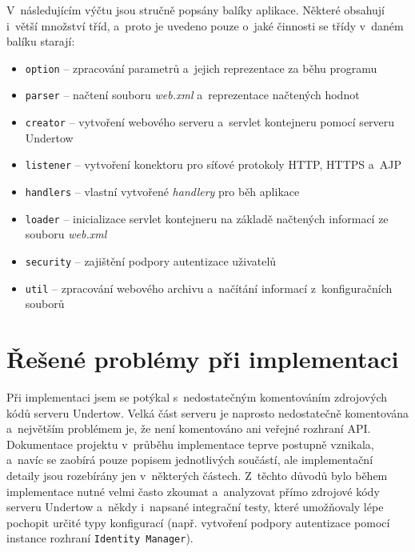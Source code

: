             V~následujícím výčtu jsou stručně popsány balíky aplikace.
            Některé obsahují i~větší množství tříd, a~proto je uvedeno pouze o~jaké činnosti
            se třídy v~daném balíku starají:
            \begin{itemize}
                \item \texttt{option} -- zpracování parametrů a~jejich reprezentace za běhu programu
                \item \texttt{parser} -- načtení souboru \emph{web.xml} a~reprezentace načtených hodnot
                \item \texttt{creator} -- vytvoření webového serveru a~servlet kontejneru pomocí serveru Undertow
                \item \texttt{listener} -- vytvoření konektoru pro síťové protokoly HTTP, HTTPS a~AJP
                \item \texttt{handlers} -- vlastní vytvořené \emph{handlery} pro běh aplikace
                \item \texttt{loader} -- inicializace servlet kontejneru na základě načtených informací ze souboru \emph{web.xml}
                \item \texttt{security} -- zajištění podpory autentizace uživatelů
                \item \texttt{util} -- zpracování webového archivu a~načítání informací z~konfiguračních souborů
            \end{itemize}

            



    \section{Řešené problémy při implementaci} \label{implProblemy}
        Při implementaci jsem se potýkal s~nedostatečným komentováním zdrojových kódů serveru Undertow.
        Velká část serveru je naprosto nedostatečně komentována a~největším problémem je, že
        není komentováno ani veřejné rozhraní API. 
        Dokumentace projektu v~průběhu implementace teprve postupně vznikala, a~navíc se zaobírá pouze popisem jednotlivých součástí,
        ale implementační detaily jsou rozebírány jen v~některých částech.
        Z~těchto důvodů bylo během implementace nutné velmi často zkoumat a~analyzovat přímo zdrojové kódy serveru Undertow
        a~někdy i~napsané integrační testy, které umožňovaly lépe pochopit určité typy konfigurací (např. vytvoření podpory autentizace
        pomocí instance rozhraní \texttt{Identity Manager}).

